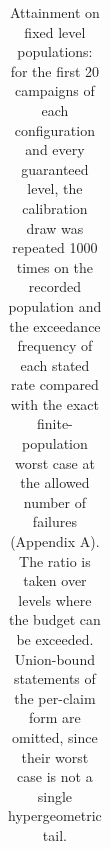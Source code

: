 \documentclass{iopjournal}
\begin{document}
{\renewcommand{\thetable}{S5.2}\small
\begin{longtable}[]{@{}
  >{\raggedright\arraybackslash}p{}
  >{\raggedright\arraybackslash}p{}
  >{\raggedright\arraybackslash}p{}
  >{\raggedright\arraybackslash}p{}
  >{\raggedright\arraybackslash}p{}
  >{\raggedright\arraybackslash}p{}
  >{\raggedright\arraybackslash}p{}@{}}
\caption{Attainment on fixed level populations: for the first 20 campaigns of each configuration and every guaranteed level, the calibration draw was repeated 1000 times on the recorded population and the exceedance frequency of each stated rate compared with the exact finite-population worst case at the allowed number of failures (Appendix A). The ratio is taken over levels where the budget can be exceeded. Union-bound statements of the per-claim form are omitted, since their worst case is not a single hypergeometric tail.}\label{tab:S5.2}\\


\end{longtable}}
\end{document}
